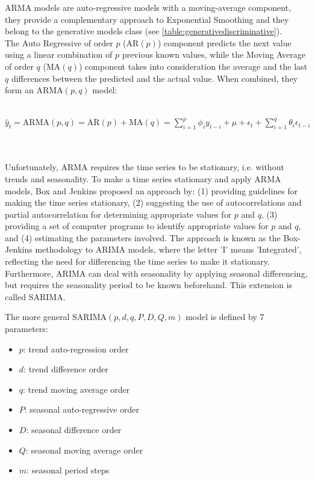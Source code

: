 \documentclass[a4paper]{article} %
\begin{document}
	ARMA models are auto-regressive models with a moving-average component, they provide a complementary approach to Exponential Smoothing and they belong to the generative models class (see \ref{table:generativediscriminative}). \\
	The Auto Regressive of order $p$ ($\text{AR}(p)$) component predicts the next value using a linear combination of $p$ previous known values, while the Moving Average of order $q$ ($\text{MA}(q)$) component takes into consideration the average and the last $q$ differences between the predicted and the actual value.  When combined, they form an ARMA$(p, q)$ model:\\\\
	\centerline{$\hat{y}_{t} = \text{ARMA}(p, q) = \text{AR}(p) + \text{MA}(q)  = \sum_{i=1}^{p}\phi_i y_{t-i} + \mu + \epsilon_t + \sum_{i=1}^{q}\theta_i \epsilon_{t-i} $}\\\\
	Unfortunately, ARMA requires the time series to be stationary, i.e. without trends and seasonality. To make a time series stationary and apply ARMA models, Box and Jenkins \cite{BoxJenkins} proposed an approach by: (1) providing guidelines for making the time series stationary, (2)  suggesting the use of autocorrelations and partial autocorrelation for determining appropriate values for $p$ and $q$, (3) providing a set of computer programs to identify appropriate values for $p$ and $q$, and (4) estimating the parameters involved. The approach is known as the Box-Jenkins methodology to ARIMA models, where the letter 'I' means 'Integrated', reflecting the need for differencing the time series to make it stationary. Furthermore, ARIMA can deal with seasonality by applying seasonal differencing, but requires the seasonality period to be known beforehand. This extension is called SARIMA.
	
	The more general SARIMA$(p, d, q, P, D, Q, m)$ model is defined by 7 parameters:
	\begin{itemize}
		\item $p$: trend auto-regression order
		\item $d$: trend difference order
		\item $q$: trend moving average order
		\item $P$: seasonal auto-regressive order
		\item $D$: seasonal difference order
		\item $Q$: seasonal moving average order
		\item $m$: seasonal period steps
	\end{itemize}
\end{document}

